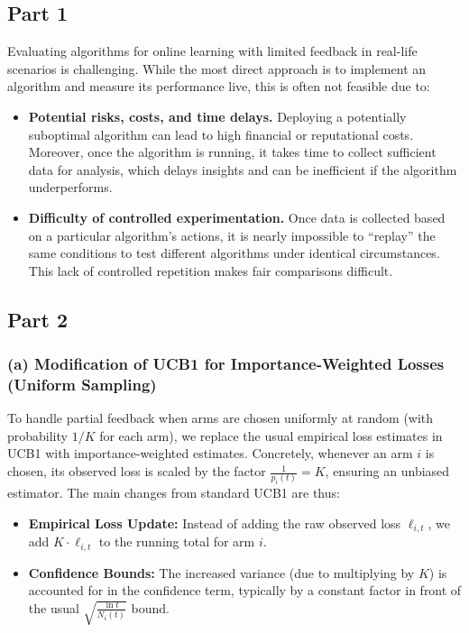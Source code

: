 \subsection{Part 1}

Evaluating algorithms for online learning with limited feedback in real-life scenarios is challenging. 
While the most direct approach is to implement an algorithm and measure its performance live, this is often not feasible due to:
\begin{itemize}
    \item \textbf{Potential risks, costs, and time delays.} Deploying a potentially suboptimal algorithm can lead to high financial or reputational costs. Moreover, once the algorithm is running, it takes time to collect sufficient data for analysis, which delays insights and can be inefficient if the algorithm underperforms.
    \item \textbf{Difficulty of controlled experimentation.} Once data is collected based on a particular algorithm's actions, it is nearly impossible to ``replay'' the same conditions to test different algorithms under identical circumstances. This lack of controlled repetition makes fair comparisons difficult.
\end{itemize}

\subsection{Part 2}

\subsubsection*{(a) Modification of UCB1 for Importance-Weighted Losses (Uniform Sampling)}

To handle partial feedback when arms are chosen uniformly at random (with probability \(1/K\) for each arm), we replace the usual empirical loss estimates in UCB1 with importance-weighted estimates. Concretely, whenever an arm \(i\) is chosen, its observed loss is scaled by the factor \(\frac{1}{p_i(t)} = K\), ensuring an unbiased estimator. The main changes from standard UCB1 are thus:
\begin{itemize}
    \item \textbf{Empirical Loss Update:} Instead of adding the raw observed loss \(\ell_{i,t}\), we add \(K\cdot \ell_{i,t}\) to the running total for arm \(i\). 
    \item \textbf{Confidence Bounds:} The increased variance (due to multiplying by \(K\)) is accounted for in the confidence term, typically by a constant factor in front of the usual \(\sqrt{\frac{\ln t}{N_i(t)}}\) bound.
\end{itemize}

